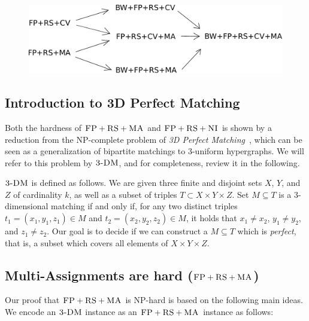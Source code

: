 \documentclass[9pt,twocolumn]{scrartcl}
\newcommand{\CC}{\textsc{NI}}
\newcommand{\FP}{\textsc{FP}}
\newcommand{\RS}{\textsc{RS}}
\newcommand{\MA}{\textsc{MA}}
\newcommand{\TDM}{\textsc{3-DM}}
\begin{document}
\begin{figure}[htbp]
\includegraphics[width = \columnwidth]{figs/np-hierarchy}
\end{figure}


\subsection{Introduction to 3D Perfect Matching}

Both the hardness of $\FP+\RS+\MA$ and $\FP+\RS+\CC$ is shown by a reduction
from the NP-complete problem of \emph{3D Perfect Matching}~\cite{3dmatch},
which
can be seen as a generalization of bipartite matchings to 3-uniform
hypergraphs. We will refer to this problem by $\TDM$, and for completeness,
review it in the following.

$\TDM$ is defined as follows. We are given three finite and disjoint
sets $X$, $Y$, and $Z$ of cardinality $k$, as well as a subset of triples $T\subset
X \times Y \times Z$.  Set $M \subseteq T$ is a 3-dimensional matching
if and only if, for any two distinct triples $t_1=(x_1, y_1, z_1) \in M$
and $t_2=(x_2, y_2, z_2) \in M$, it holds that $x_1\neq x_2$, $y_1\neq
y_2$, and $z_1\neq z_2$. Our goal is to decide if we can construct
a $M \subseteq T$ which is \emph{perfect}, that is, a subset which covers all
elements of $X \times Y \times Z$.


\subsection{Multi-Assignments are hard ($\FP+\RS+\MA$)}\label{ssec:fprsma}

Our proof that $\FP+\RS+\MA$ is NP-hard is based on the following main ideas.
We encode an $\TDM$ instance as an $\FP+\RS+\MA$ instance as follows:
\end{document}

